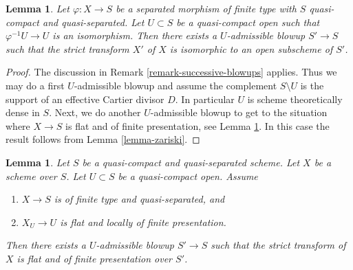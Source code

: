 \documentclass{amsart}
\theoremstyle{plain}
\newtheorem{lemma}[subsection]{Lemma}
\theoremstyle{definition}
\theoremstyle{remark}
\numberwithin{equation}{subsection}
\begin{document}
\begin{lemma}
\label{lemma-zariski-after-blowup}
Let $\varphi : X \to S$ be a separated morphism of finite type with
$S$ quasi-compact and quasi-separated. Let $U \subset S$ be a
quasi-compact open such that $\varphi^{-1}U \to U$ is an isomorphism.
Then there exists a $U$-admissible blowup $S' \to S$ such that
the strict transform $X'$ of $X$ is isomorphic to an open subscheme
of $S'$.
\end{lemma}

\begin{proof}
The discussion in Remark \ref{remark-successive-blowups} applies.
Thus we may do a first $U$-admissible blowup and assume the complement
$S \setminus U$ is the support of an effective Cartier divisor $D$.
In particular $U$ is scheme theoretically dense in $S$.
Next, we do another $U$-admissible blowup to get to the situation where
$X \to S$ is flat and of finite presentation, see
Lemma \ref{lemma-flat-after-blowing-up}.
In this case the result follows from Lemma \ref{lemma-zariski}.
\end{proof}


\begin{lemma}
\label{lemma-flat-after-blowing-up}
Let $S$ be a quasi-compact and quasi-separated scheme.
Let $X$ be a scheme over $S$.
Let $U \subset S$ be a quasi-compact open.
Assume
\begin{enumerate}
\item $X \to S$ is of finite type and quasi-separated, and
\item $X_U \to U$ is flat and locally of finite presentation.
\end{enumerate}
Then there exists a $U$-admissible blowup $S' \to S$ such that
the strict transform of $X$ is flat and of finite presentation
over $S'$.
\end{lemma}
\end{document}

